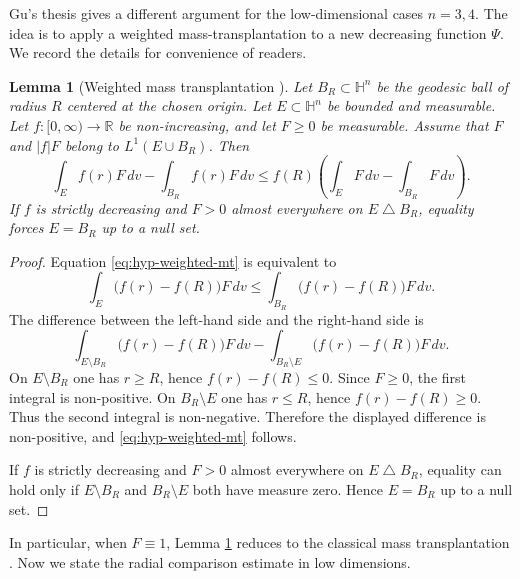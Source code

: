 \documentclass[11pt,reqno]{amsart}
\numberwithin{equation}{section}
\newtheorem{lemma}[theorem]{Lemma}
\theoremstyle{definition}
\newcommand{\HH}{\mathbb H}
\begin{document}
Gu's thesis \cite[Section~4.3.2]{GuThesis2026} gives a different argument for the low-dimensional cases $n=3,4$.  The idea is to apply a weighted mass-transplantation to a new decreasing function $\Psi$.  We record the details for convenience of readers.

\begin{lemma}[Weighted mass transplantation \cite{GuThesis2026,GLW26}]\label{lem:hyp-weighted-mass-transplant}
Let $B_R\subset \HH^n$ be the geodesic ball of radius $R$ centered at the chosen origin.  Let $E\subset\HH^n$ be bounded and measurable.  Let $f:[0,\infty)\to\mathbb R$ be non-increasing, and let $F\geq0$ be measurable.  Assume that $F$ and $|f|F$ belong to $L^1(E\cup B_R)$.  Then
\begin{equation}\label{eq:hyp-weighted-mt}
    \int_E f(r)F\,dv-\int_{B_R}f(r)F\,dv
    \leq
    f(R)\left(\int_EF\,dv-\int_{B_R}F\,dv\right).
\end{equation}
If $f$ is strictly decreasing and $F>0$ almost everywhere on $E\mathbin{\triangle}B_R$, equality forces $E=B_R$ up to a null set.
\end{lemma}

\begin{proof}
Equation \eqref{eq:hyp-weighted-mt} is equivalent to
\begin{equation*}
\int_E \bigl(f(r)-f(R)\bigr)F\,dv
\le
\int_{B_R}\bigl(f(r)-f(R)\bigr)F\,dv.
\end{equation*}
The difference between the left-hand side and the right-hand side is
\begin{equation*}
\int_{E\setminus B_R}\bigl(f(r)-f(R)\bigr)F\,dv
-
\int_{B_R\setminus E}\bigl(f(r)-f(R)\bigr)F\,dv.
\end{equation*}
On $E\setminus B_R$ one has $r\geq R$, hence $f(r)-f(R)\leq0$.  Since $F\geq0$, the first integral is non-positive.  On $B_R\setminus E$ one has $r\leq R$, hence $f(r)-f(R)\geq0$.  Thus the second integral is non-negative.  Therefore the displayed difference is non-positive, and \eqref{eq:hyp-weighted-mt} follows.

If $f$ is strictly decreasing and $F>0$ almost everywhere on $E\mathbin{\triangle}B_R$, equality can hold only if $E\setminus B_R$ and $B_R\setminus E$ both have measure zero.  Hence $E=B_R$ up to a null set.
\end{proof}

In particular, when $F\equiv 1$, Lemma \ref{lem:hyp-weighted-mass-transplant} reduces to the classical mass transplantation \cite{We56,FL21}.  Now we state the radial comparison estimate in low dimensions. 
\end{document}
